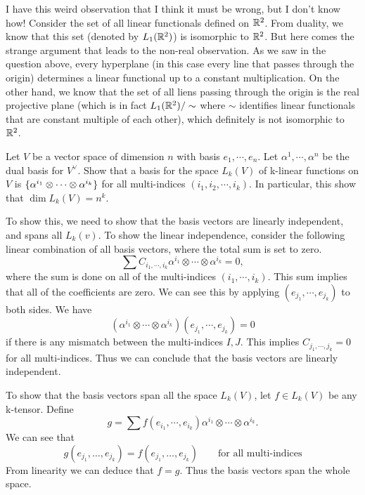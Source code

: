 \begin{observation}
	I have this weird observation that I think it must be wrong, but I don't know how! Consider the set of all linear functionals defined on $ \mathbb{R}^2 $. From duality, we know that this set (denoted by $ L_1(\mathbb{R}^2) $) is isomorphic to $ \mathbb{R}^2 $. But here comes the strange argument that leads to the non-real observation. As we saw in the question above, every hyperplane (in this case every line that passes through the origin) determines a linear functional up to a constant multiplication. On the other hand, we know that the set of all liens passing through the origin is the real projective plane (which is in fact $ L_1(\mathbb{R}^2)/\sim $ where $ \sim $ identifies linear functionals that are constant multiple of each other), which definitely is not isomorphic to $ \mathbb{R}^2 $.
\end{observation}

\begin{problem}
	Let $ V $ be a vector space of dimension $ n $ with basis $ e_1,\cdots,e_n $. Let $ \alpha^1,\cdots,\alpha^n $ be the dual basis for $ V^\vee $. Show that a basis for the space $ L_k(V) $ of k-linear functions on $ V $ is $ \{\alpha^{i_1}\otimes \cdots \otimes \alpha^{i_k}\} $ for all multi-indices $ (i_1,i_2,\cdots,i_k) $. In particular, this show that $\dim L_k(V) = n^k $.
\end{problem}

\begin{solution}
	To show this, we need to show that the basis vectors are linearly independent, and spans all $ L_k(v) $. To show the linear independence, consider the following linear combination of all basis vectors, where the total sum is set to zero.
	\[ \sum C_{i_1,\cdots,i_k} \alpha^{i_1}\otimes \cdots \otimes \alpha^{i_k}  = 0, \]
	where the sum is done on all of the multi-indices $ (i_1,\cdots,i_k) $. This sum implies that all of the coefficients are zero. We can see this by applying $ (e_{j_1},\cdots,e_{j_k}) $ to both sides. We have
	\[ (\alpha^{i_1}\otimes \cdots \otimes \alpha^{i_k})(e_{j_1},\cdots,e_{j_k}) = 0 \]
	if there is any mismatch between the multi-indices $ I, J$. This implies $ C_{j_1,\cdots,j_k} = 0$ for all multi-indices. Thus we can conclude that the basis vectors are linearly independent.
	
	To show that the basis vectors span all the space $ L_k(V) $, let $ f \in L_k(V) $ be any k-tensor. Define
	\[ g = \sum f(e_{i_1},\cdots,e_{i_k})\alpha^{i_1}\otimes \cdots \otimes \alpha^{i_k}. \]
	We can see that 
	\[ g(e_{j_1},\dots,e_{j_k}) = f( e_{j_1},\dots,e_{j_k} ) \qquad \text{for all multi-indices} \]
	From linearity we can deduce that $ f=g $. Thus the basis vectors span the whole space.
\end{solution}

